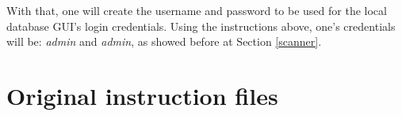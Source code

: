 \documentclass[10pt,a4paper]{article}
\begin{document}
With that, one will create the username and password to be used for the local database GUI's login credentials. Using the instructions above, one's credentials will be: \textit{admin} and \textit{admin}, as showed before at Section \ref{scanner}.

\newpage

\section{Original instruction files}


\end{document}
